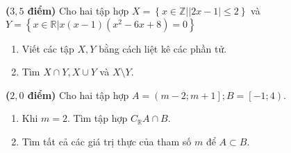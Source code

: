 \begin{bt}%
	\textbf{($3,5$ điểm)} Cho hai tập hợp $X = \left\{x \in \mathbb{Z}\big| \left|2x - 1\right| \le 2\right\}$ và\\
	$Y = \left\{x \in \mathbb{R}\big|x(x-1)(x^2 - 6x + 8) = 0\right\}$ 
	\begin{enumerate}
		\item Viết các tập $X,Y$ bằng cách liệt kê các phần tử.
		\item Tìm $X \cap Y, X\cup Y$ và $ X\setminus Y$.
	\end{enumerate}
\end{bt}
\begin{bt}%
	\textbf{($2,0$ điểm)} Cho hai tập hợp $A = \left( m-2; m + 1\right]; B =\left[ -1; 4\right)$. 
	\begin{enumerate}
		\item Khi $m=2$. Tìm tập hợp $C_\mathbb{R}A \cap B$.
		\item Tìm tất cả các giá trị thực của tham số $m$ để $A \subset B$.
	\end{enumerate} 
	\loigiai{
		\begin{enumerate}
			\item Với $m=2$ thì $A=(0;3] \Rightarrow C_\mathbb{R}A =(- \infty;0]\cup (3;+\infty)$.\\
			Khi đó $  C_\mathbb{R}A \cap B =[-1;0]\cup(3;4)$. 
			\item Để $A \subset B$ thì $\heva{& m-2 \geq -1\\& m + 1 < 4}$ \\ 
			$\Leftrightarrow \heva{& m \geq 1 \\ & m < 3} \Leftrightarrow 1\le m < 3$
		\end{enumerate} 
	}
\end{bt} 

